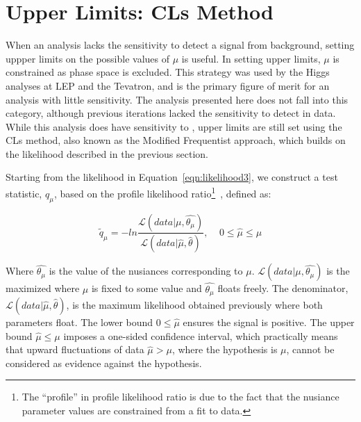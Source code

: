 \section{Upper Limits: CLs Method}
When an analysis lacks the sensitivity to detect a signal from background, setting uppper limits on the possible values of $\mu$ is useful. In setting upper
limits, $\mu$ is constrained as phase space is excluded. This strategy was used by the Higgs analyses at LEP and the Tevatron, and is the primary figure of merit
for an analysis with little sensitivity. The \tth analysis presented here does not fall into this category, although previous iterations lacked the sensitivity
to detect \tth in data. While this analysis does have sensitivity to \tth, upper limits are still set using the CLs method, also known as the
Modified Frequentist approach, which builds on the likelihood described in the previous section. 

Starting from the likelihood in Equation~\ref{eqn:likelihood3}, we construct a test statistic, $q_{\mu}$, based on the profile likelihood ratio\footnote{The ``profile'' in profile
likelihood ratio is due to the fact that the nusiance parameter values are constrained from a fit to data.}~\cite{AsymptoticLimits},
defined as:

\begin{equation}
\label{eqn:test_stat}
\tilde{q}_{\mu} = -ln \frac{\mathcal{L}(data|\mu,\hat{\theta_{\mu}})}{\mathcal{L}(data|\hat{\mu},\hat{\theta})},~~~~~0 \leq \hat{\mu} \leq{\mu}
\end{equation}

\noindent Where $\hat{\theta_{\mu}}$ is the value of the nusiances corresponding to $\mu$. $\mathcal{L}(data|\mu,\hat{\theta_{\mu}})$ is the maximized where $\mu$
is fixed to some value and $\hat{\theta_{\mu}}$ floats freely. The denominator, $\mathcal{L}(data|\hat{\mu},\hat{\theta})$, is the maximum likelihood obtained
previously where both parameters float. The lower bound $0 \leq \hat{\mu}$ ensures the signal is positive. The upper bound $\hat{\mu} \leq \mu$ imposes a one-sided
confidence interval, which practically means that upward fluctuations of data $\hat{\mu} > \mu$, where the hypothesis is $\mu$, cannot be considered as evidence
against the hypothesis.  

